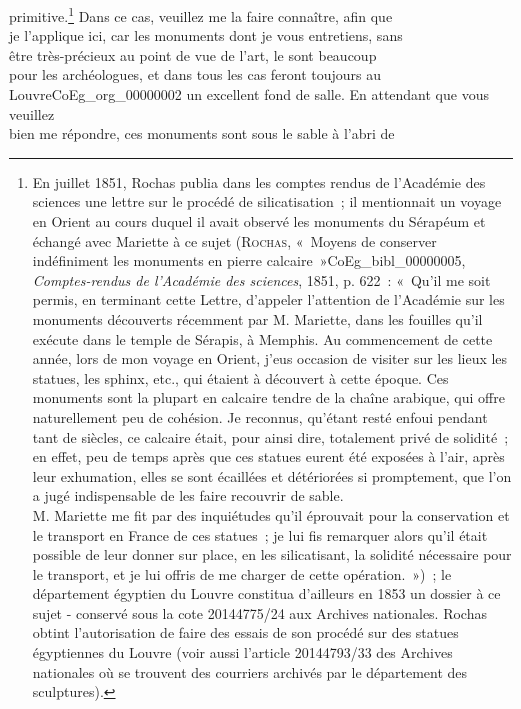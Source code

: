 \documentclass{book}
\begin{document}
primitive.\footnote{En juillet 1851, Rochas publia dans les comptes rendus de l'Académie des sciences une lettre sur le procédé de silicatisation~; il mentionnait un voyage en Orient au cours duquel il avait observé les monuments du Sérapéum et échangé avec Mariette à ce sujet (\textsc{Rochas}, «~Moyens de conserver indéfiniment les monuments en pierre calcaire~»\gls{CoEg_bibl_00000005}, \textit{Comptes-rendus de l’Académie des sciences}, 1851, p. 622~: «~Qu’il me soit permis, en terminant cette Lettre, d’appeler l’attention de l’Académie sur les monuments découverts récemment par M. Mariette, dans les fouilles qu’il exécute dans le temple de Sérapis, à Memphis. Au commencement de cette année, lors de mon voyage en Orient, j’eus occasion de visiter sur les lieux les statues, les sphinx, etc., qui étaient à découvert à cette époque. Ces monuments sont la plupart en calcaire tendre de la chaîne arabique, qui offre naturellement peu de cohésion. Je reconnus, qu’étant resté enfoui pendant tant de siècles, ce calcaire était, pour ainsi dire, totalement privé de solidité~; en effet, peu de temps après que ces statues eurent été exposées à l’air, après leur exhumation, elles se sont écaillées et détériorées si promptement, que l’on a jugé indispensable de les faire recouvrir de sable.\\
\indent M. Mariette me fit par des inquiétudes qu’il éprouvait pour la conservation et le transport en France de ces statues~; je lui fis remarquer alors qu’il était possible de leur donner sur place, en les silicatisant, la solidité nécessaire pour le transport, et je lui offris de me charger de cette opération.~»)~; le département égyptien du Louvre constitua d'ailleurs en 1853 un dossier à ce sujet - conservé sous la cote 20144775/24 aux Archives nationales. Rochas obtint l'autorisation de faire des essais de son procédé sur des statues égyptiennes du Louvre (voir aussi l'article 20144793/33 des Archives nationales où se trouvent des courriers archivés par le département des sculptures).} Dans ce cas, veuillez me la faire connaître, afin que\\
je l’applique ici, car les monuments dont je vous entretiens, sans\\
être très-précieux au point de vue de l’art, le sont beaucoup\\
pour les archéologues, et dans tous les cas feront toujours au\\
Louvre\gls{CoEg_org_00000002} un excellent fond de salle. En attendant que vous veuillez\\
bien me répondre, ces monuments sont sous le sable à l’abri de\\
\end{document}
